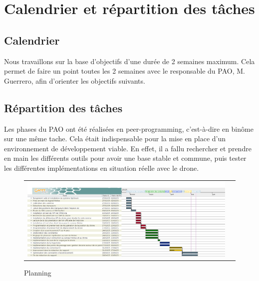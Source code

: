 \chapter{Calendrier et répartition des tâches}

\section{Calendrier}

	Nous travaillons sur la base d'objectifs d'une durée de 2 semaines maximum. Cela permet de faire un point toutes les 2 semaines avec le responsable du PAO, M. Guerrero, afin d'orienter les objectifs suivants.

\section{Répartition des tâches}
	Les phases du PAO ont été réalisées en peer-programming, c'est-à-dire en binôme sur une même tache. Cela était indispensable pour la mise en place d'un environnement de développement viable. En effet, il a fallu rechercher et prendre en main les différents outils pour avoir une base stable et commune, puis tester les différentes implémentations en situation réelle avec le drone.

	\begin{figure}
	\hspace{-1cm}
	\begin{tabular}{|@{}l@{}l}
		\includegraphics[width=24cm,angle=90]{images/plannification.png}
	 \end{tabular}
	 \caption{Planning}
	 \end{figure}
